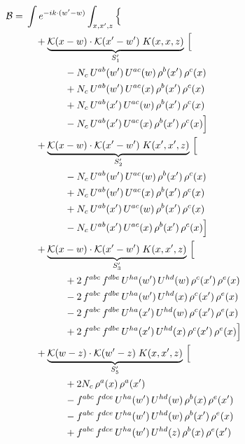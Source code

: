 \documentclass[10pt]{article}
\numberwithin{equation}{section}
\newcommand{\KK}{\mathcal K}
\begin{document}
\begin{align}
\mathcal B={}&\int e^{-ik\cdot(w'-w)}\int_{x,x',z}\Big\{\notag\\
&\quad +\underbrace{\KK(x-w)\cdot\KK(x'-w')\;K(x,x,z)}_{S'_{1}}\,\Big[\notag\\
&\qquad\qquad - N_c\,U^{ab}(w')\,U^{ac}(w)\,\rho^{b}(x')\,\rho^{c}(x)\notag\\
&\qquad\qquad +N_c\,U^{ab}(w')\,U^{ac}(x)\,\rho^{b}(x')\,\rho^{c}(x)\notag\\
&\qquad\qquad +N_c\,U^{ab}(x')\,U^{ac}(w)\,\rho^{b}(x')\,\rho^{c}(x)\notag\\
&\qquad\qquad - N_c\,U^{ab}(x')\,U^{ac}(x)\,\rho^{b}(x')\,\rho^{c}(x)\Big]\notag\\
&\quad +\underbrace{\KK(x-w)\cdot\KK(x'-w')\;K(x',x',z)}_{S'_{2}}\,\Big[\notag\\
&\qquad\qquad - N_c\,U^{ab}(w')\,U^{ac}(w)\,\rho^{b}(x')\,\rho^{c}(x)\notag\\
&\qquad\qquad +N_c\,U^{ab}(w')\,U^{ac}(x)\,\rho^{b}(x')\,\rho^{c}(x)\notag\\
&\qquad\qquad +N_c\,U^{ab}(x')\,U^{ac}(w)\,\rho^{b}(x')\,\rho^{c}(x)\notag\\
&\qquad\qquad - N_c\,U^{ab}(x')\,U^{ac}(x)\,\rho^{b}(x')\,\rho^{c}(x)\Big]\notag\\
&\quad +\underbrace{\KK(x-w)\cdot\KK(x'-w')\;K(x,x',z)}_{S'_{3}}\,\Big[\notag\\
&\qquad\qquad +2\,f^{abc}\,f^{dbe}\,U^{ha}(w')\,U^{hd}(w)\,\rho^{c}(x')\,\rho^{e}(x)\notag\\
&\qquad\qquad -2\,f^{abc}\,f^{dbe}\,U^{ha}(w')\,U^{hd}(x)\,\rho^{c}(x')\,\rho^{e}(x)\notag\\
&\qquad\qquad -2\,f^{abc}\,f^{dbe}\,U^{ha}(x')\,U^{hd}(w)\,\rho^{c}(x')\,\rho^{e}(x)\notag\\
&\qquad\qquad +2\,f^{abc}\,f^{dbe}\,U^{ha}(x')\,U^{hd}(x)\,\rho^{c}(x')\,\rho^{e}(x)\Big]\notag\\
&\quad +\underbrace{\KK(w-z)\cdot\KK(w'-z)\;K(x,x',z)}_{S'_{5}}\,\Big[\notag\\
&\qquad\qquad +2 N_c\,\rho^{a}(x)\,\rho^{a}(x')\notag\\
&\qquad\qquad -f^{abc}\,f^{dce}\,U^{ha}(w')\,U^{hd}(w)\,\rho^{b}(x)\,\rho^{e}(x')\notag\\
&\qquad\qquad -f^{abc}\,f^{dce}\,U^{ha}(w')\,U^{hd}(w)\,\rho^{b}(x')\,\rho^{e}(x)\notag\\
&\qquad\qquad +f^{abc}\,f^{dce}\,U^{ha}(w')\,U^{hd}(z)\,\rho^{b}(x)\,\rho^{e}(x')\notag\\

\end{align}
\end{document}
